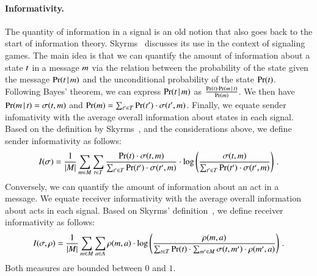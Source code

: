 \paragraph{Informativity.}
The quantity of information in a signal is an old notion that also goes back to the start of information theory.
Skyrms~\citet[ch.~3]{Skyrms2010} discusses its use in the context of signaling games.
The main idea is that we can quantify the amount of information about a state $t$ in a message $m$ via the relation between the probability of the state given the message $\Pr(t \,|\, m)$ and the unconditional probability of the state $\Pr(t)$.
Following Bayes' theorem, we can express $\Pr(t \,|\, m)$ as $\frac{\Pr(t) \cdot \Pr(m \,|\, t)}{\Pr(m)}$.
We then have $\Pr(m \,|\, t) = \sigma(t,m)$ and $\Pr(m) = \sum_{t^\prime \in T} \Pr(t^\prime) \cdot \sigma(t^\prime,m)$.
Finally, we equate sender infomativity with the average overall information about states in each signal.
Based on the definition by Skyrms~\citet[p.~36]{Skyrms2010}, and the considerations above, we define sender informativity as follows:
\begin{align*}
  I(\sigma) = \frac{1}{|M|} \sum_{m \in M} \sum_{t \in T} \frac{\Pr(t) \cdot \sigma(t,m)}{\sum_{t^\prime \in T} \Pr(t^\prime) \cdot \sigma(t^\prime,m)} \cdot \log \left(\frac{\sigma(t,m)}{\sum_{t^\prime \in T} \Pr(t^\prime) \cdot \sigma(t^\prime,m)} \right) \,.
\end{align*}
Conversely, we can quantify the amount of information about an act in a message.
We equate receiver informativity with the average overall information about acts in each signal.
Based on Skyrms' definition~\citet[p.~39]{Skyrms2010}, we define receiver informativity as follows:
\begin{align*}
  I(\sigma,\rho) = \frac{1}{|M|} \sum_{m \in M} \sum_{a \in A} \rho(m,a) \cdot \log \left(\frac{\rho(m,a)}{\sum_{t \in T} \Pr(t) \cdot \sum_{m^\prime \in M} \sigma(t,m^\prime) \cdot \rho(m^\prime,a)} \right) \,.
\end{align*}
Both measures are bounded between $0$ and $1$.

